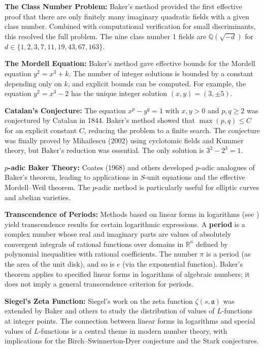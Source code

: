 \textbf{The Class Number Problem:} Baker's method \cite{baker1966} provided the first effective proof that there are only finitely many imaginary quadratic fields with a given class number. Combined with computational verification for small discriminants, this resolved the full problem. The nine class number 1 fields are $\mathbb{Q}(\sqrt{-d})$ for $d \in \{1, 2, 3, 7, 11, 19, 43, 67, 163\}$.

\textbf{The Mordell Equation:} Baker's method \cite{baker1966} gave effective bounds for the Mordell equation $y^2 = x^3 + k$. The number of integer solutions is bounded by a constant depending only on $k$, and explicit bounds can be computed. For example, the equation $y^2 = x^3 - 2$ has the unique integer solution $(x, y) = (3, \pm 5)$.

\textbf{Catalan's Conjecture:} The equation $x^p - y^q = 1$ with $x, y > 0$ and $p, q \geq 2$ was conjectured by Catalan in 1844. Baker's method \cite{baker1966} showed that $\max(p, q) \leq C$ for an explicit constant $C$, reducing the problem to a finite search. The conjecture was finally proved by Mihailescu (2002) using cyclotomic fields and Kummer theory, but Baker's reduction was essential. The only solution is $3^2 - 2^3 = 1$.

\textbf{$p$-adic Baker Theory:} Coates (1968) and others developed $p$-adic analogues of Baker's theorem, leading to applications in $S$-unit equations and the effective Mordell--Weil theorem. The $p$-adic method is particularly useful for elliptic curves and abelian varieties.

\textbf{Transcendence of Periods:} Methods based on linear forms in logarithms (see \cite{baker1966}) yield transcendence results for certain logarithmic expressions. A \textbf{period} is a complex number whose real and imaginary parts are values of absolutely convergent integrals of rational functions over domains in $\mathbb{R}^n$ defined by polynomial inequalities with rational coefficients. The number $\pi$ is a period (as the area of the unit disk), and so is $e$ (via the exponential function). Baker's theorem applies to specified linear forms in logarithms of algebraic numbers; it does not imply a general transcendence criterion for periods.

\textbf{Siegel's Zeta Function:} Siegel's work on the zeta function $\zeta(s, \mathfrak{a})$ was extended by Baker and others to study the distribution of values of $L$-functions at integer points. The connection between linear forms in logarithms and special values of $L$-functions is a central theme in modern number theory, with implications for the Birch--Swinnerton-Dyer conjecture and the Stark conjectures.

